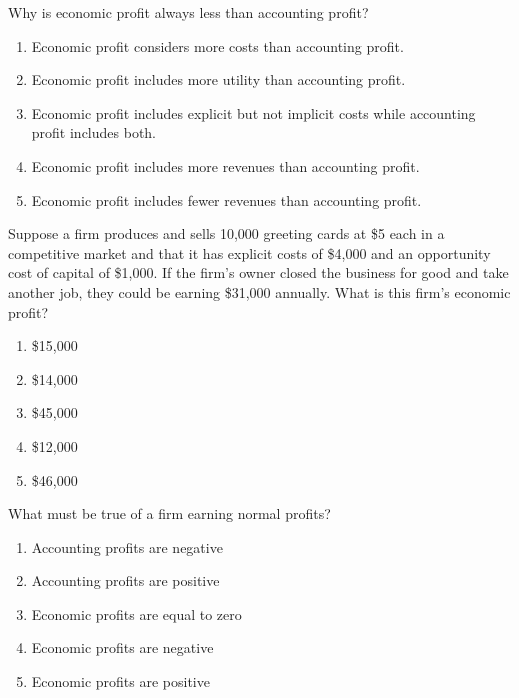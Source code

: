 \documentclass[12pt]{article}
\begin{document}
\begin{flushleft}
\vspace{1.325cm}
Why is economic profit always less than accounting profit?
\end{flushleft}

\begin{enumerate}[label = (\alph*)]
	\item Economic profit considers more costs than accounting profit.
	\item Economic profit includes more utility than accounting profit.
	\item Economic profit includes explicit but not implicit costs while accounting profit includes both.
	\item Economic profit includes more revenues than accounting profit.
	\item Economic profit includes fewer revenues than accounting profit.
\end{enumerate}


\begin{flushleft}
Suppose a firm produces and sells 10,000 greeting cards at \$5 each in a competitive market and that it has explicit costs of \$4,000 and an opportunity cost of capital of \$1,000. If the firm's owner closed the business for good and take another job, they could be earning \$31,000 annually. What is this firm's economic profit?
\end{flushleft}

\begin{enumerate}[label = (\alph*)]
	\item \$15,000
	\item \$14,000
	\item \$45,000
	\item \$12,000
	\item \$46,000
\end{enumerate}


\begin{flushleft}
What must be true of a firm earning normal profits?
\end{flushleft}

\begin{enumerate}[label = (\alph*)]
	\item Accounting profits are negative
	\item Accounting profits are positive
	\item Economic profits are equal to zero
	\item Economic profits are negative
	\item Economic profits are positive
\end{enumerate}
\end{document}
